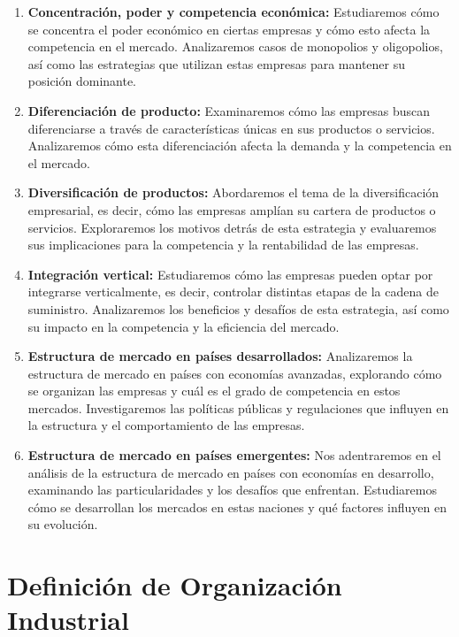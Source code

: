 \documentclass[
  doc,
  floatsintext,
  longtable,
  a4paper,
  nolmodern,
  notxfonts,
  notimes,
  12pt,
  colorlinks=true,linkcolor=blue,citecolor=blue,urlcolor=blue]{apa7}
\begin{document}
\begin{enumerate}
\def\labelenumi{\arabic{enumi}.}
\item
  \textbf{Concentración, poder y competencia económica:} Estudiaremos
  cómo se concentra el poder económico en ciertas empresas y cómo esto
  afecta la competencia en el mercado. Analizaremos casos de monopolios
  y oligopolios, así como las estrategias que utilizan estas empresas
  para mantener su posición dominante.
\item
  \textbf{Diferenciación de producto:} Examinaremos cómo las empresas
  buscan diferenciarse a través de características únicas en sus
  productos o servicios. Analizaremos cómo esta diferenciación afecta la
  demanda y la competencia en el mercado.
\item
  \textbf{Diversificación de productos:} Abordaremos el tema de la
  diversificación empresarial, es decir, cómo las empresas amplían su
  cartera de productos o servicios. Exploraremos los motivos detrás de
  esta estrategia y evaluaremos sus implicaciones para la competencia y
  la rentabilidad de las empresas.
\item
  \textbf{Integración vertical:} Estudiaremos cómo las empresas pueden
  optar por integrarse verticalmente, es decir, controlar distintas
  etapas de la cadena de suministro. Analizaremos los beneficios y
  desafíos de esta estrategia, así como su impacto en la competencia y
  la eficiencia del mercado.
\item
  \textbf{Estructura de mercado en países desarrollados:} Analizaremos
  la estructura de mercado en países con economías avanzadas, explorando
  cómo se organizan las empresas y cuál es el grado de competencia en
  estos mercados. Investigaremos las políticas públicas y regulaciones
  que influyen en la estructura y el comportamiento de las empresas.
\item
  \textbf{Estructura de mercado en países emergentes:} Nos adentraremos
  en el análisis de la estructura de mercado en países con economías en
  desarrollo, examinando las particularidades y los desafíos que
  enfrentan. Estudiaremos cómo se desarrollan los mercados en estas
  naciones y qué factores influyen en su evolución.
\end{enumerate}

\section{Definición de Organización
Industrial}\label{definiciuxf3n-de-organizaciuxf3n-industrial}
\end{document}

